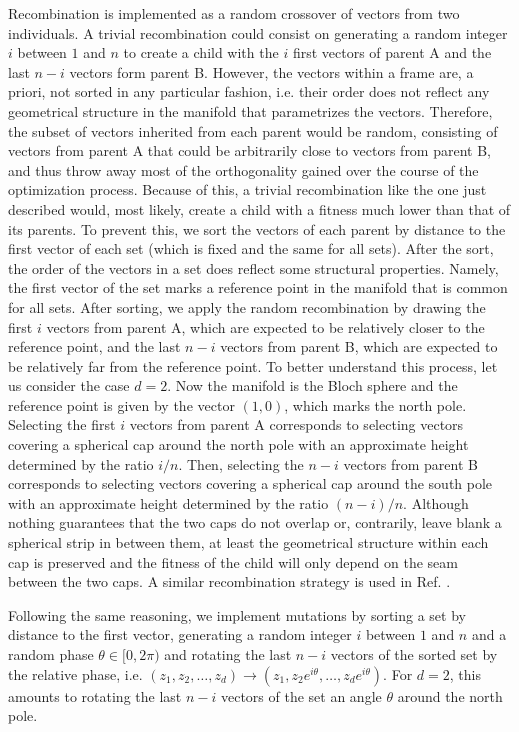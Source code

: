 \documentclass[%
superscriptaddress,
amsmath,amssymb,
 aps,
pra,
floatfix,
]{revtex4-2}
\begin{document}
Recombination is implemented as a random crossover of vectors from two individuals. A trivial recombination could consist on generating a random integer $i$ between $1$ and $n$ to create a child with the $i$ first vectors of parent A and the last $n - i$ vectors form parent B. However, the vectors within a frame are, a priori, not sorted in any particular fashion, i.e. their order does not reflect any geometrical structure in the manifold that parametrizes the vectors.  Therefore, the subset of vectors inherited from each parent would be random, consisting of vectors from parent A that could be arbitrarily close to vectors from parent B, and thus throw away most of the orthogonality gained over the course of the optimization process. 
Because of this, a trivial recombination like the one just described would, most likely, create a child with a fitness much lower than that of its parents. To prevent this, we sort the vectors of each parent by distance to the first vector of each set (which is fixed and the same for all sets). After the sort, the order of the vectors in a set does reflect some structural properties. Namely, the first vector of the set marks a reference point in the manifold that is common for all sets. After sorting, we apply the random recombination by drawing the first $i$ vectors from parent A, which are expected to be relatively closer to the reference point, and the last $n - i$ vectors from parent B, which are expected to be relatively far from the reference point. To better understand this process, let us consider the case $d=2$. Now the manifold is the Bloch sphere and the reference point is given by the vector $(1, 0)$, which marks the north pole. Selecting the first $i$ vectors from parent A corresponds to selecting vectors covering a spherical cap around the north pole with an approximate height determined by the ratio $i/n$. Then, selecting the $n - i$ vectors from parent B corresponds to selecting vectors covering a spherical cap around the south pole with an approximate height determined by the ratio $(n - i)/n$. Although nothing guarantees that the two caps do not overlap or, contrarily, leave blank a spherical strip in between them, at least the geometrical structure within each cap is preserved and the fitness of the child will only depend on the seam between the two caps. A similar recombination strategy is used in Ref. \cite{morris1996geneticalgorithm}.

Following the same reasoning, we implement mutations by sorting a set by distance to the first vector, generating a random integer $i$ between $1$ and $n$ and a random phase $\theta \in [0, 2\pi)$ and rotating the last $n - i$ vectors of the sorted set by the relative phase, i.e. $(z_1, z_2, \ldots, z_d) \to (z_1, z_2 e^{i \theta}, \ldots, z_d e^{i \theta})$. For $d=2$, this amounts to rotating the last $n - i$ vectors of the set an angle $\theta$ around the north pole. 
\end{document}

